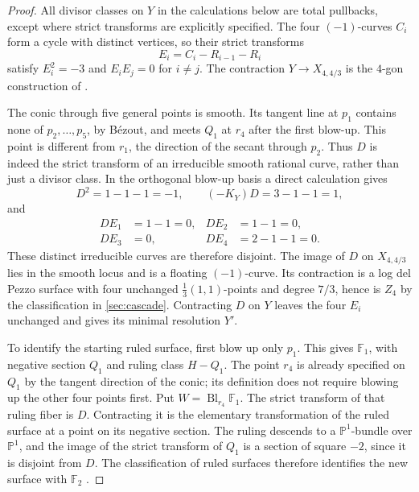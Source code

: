 \documentclass[11pt]{article}
\theoremstyle{plain}
\theoremstyle{definition}
\theoremstyle{remark}
\newcommand{\Pp}{\mathbb P}
\newcommand{\F}{\mathbb F}
\newcommand{\Bl}{\operatorname{Bl}}
\begin{document}
\begin{proof}
All divisor classes on \(Y\) in the calculations below are total
pullbacks, except where strict transforms are explicitly specified.
The four \((-1)\)-curves \(C_i\) form a cycle with distinct vertices,
so their strict transforms
\[
E_i=C_i-R_{i-1}-R_i
\]
satisfy \(E_i^2=-3\) and \(E_iE_j=0\) for \(i\ne j\).
The contraction \(Y\to X_{4,4/3}\) is the \(4\)-gon construction
of \cite[Section~3.5]{Corti2016}.

The conic through five general points is smooth. Its tangent line at
\(p_1\) contains none of \(p_2,\ldots,p_5\), by B\'ezout, and
meets \(Q_1\) at \(r_4\) after the first blow-up. This point is
different from \(r_1\), the direction of the secant through \(p_2\).
Thus \(D\) is indeed the strict transform of an irreducible smooth
rational curve, rather than just a divisor class. In the orthogonal
blow-up basis a direct calculation gives
\[
D^2=1-1-1=-1,\qquad
(-K_Y)D=3-1-1=1,
\]
and
\[
\begin{aligned}
DE_1&=1-1=0,& DE_2&=1-1=0,\\
DE_3&=0,& DE_4&=2-1-1=0.
\end{aligned}
\]
These distinct irreducible curves are therefore disjoint. The image of
\(D\) on \(X_{4,4/3}\) lies in the smooth locus and is a floating
\((-1)\)-curve. Its contraction is a log del Pezzo surface with four
unchanged \(\frac13(1,1)\)-points and degree \(7/3\), hence is
\(Z_4\) by the classification in \cref{sec:cascade}. Contracting
\(D\) on \(Y\) leaves the four \(E_i\) unchanged and gives its
minimal resolution \(Y'\).

To identify the starting ruled surface, first blow up only \(p_1\).
This gives \(\F_1\), with negative section \(Q_1\) and ruling
class \(H-Q_1\). The point \(r_4\) is already specified on
\(Q_1\) by the tangent direction of the conic; its definition does
not require blowing up the other four points first. Put
\(W=\Bl_{r_4}\F_1\). The strict transform of that ruling fiber
is \(D\). Contracting it is the elementary transformation of the
ruled surface at a point on its negative section. The ruling descends
to a \(\Pp^1\)-bundle over \(\Pp^1\), and the image of the
strict transform of \(Q_1\) is a section of square \(-2\), since
it is disjoint from \(D\). The classification of ruled surfaces
therefore identifies the new surface with \(\F_2\)
\cite[Chapter~V, Section~2]{Hartshorne1977}.


\end{proof}
\end{document}
